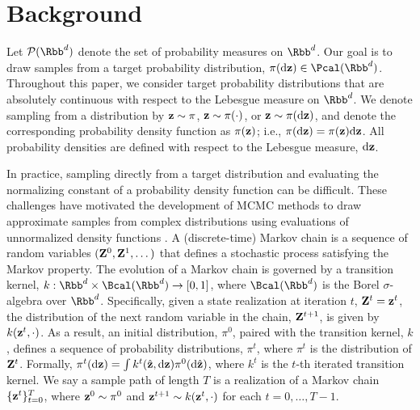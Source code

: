 \documentclass[onefignum,onetabnum]{siamonline250211}
\renewcommand{\d} {{\rm d}}                                %
\newcommand{\bfZ}{{\bf Z}}
\newcommand{\bfz}{{\bf z}}
\begin{document}
%
\section{Background}
\label{sec:background}
Let $\mathcal{P}(\Rbb^d)$ denote the set of probability measures on $\Rbb^d$. 
Our goal is to draw samples from a target probability distribution, $\pi(\d \bfz) \in \Pcal(\Rbb^d)$. Throughout this paper, we consider target probability distributions that are absolutely continuous with respect to the Lebesgue measure on $\Rbb^d$. 
We denote sampling from a distribution by $\bfz \sim \pi$, $\bfz\sim \pi(\cdot)$, or  $\bfz \sim \pi(\d \bfz)$, and denote the corresponding probability density function as $\pi(\bfz)$; i.e., $\pi(\d\bfz)=\pi(\bfz)\d\bfz$. All probability densities are defined with respect to the Lebesgue measure, $\d\bfz$. %

In practice, sampling directly from a target distribution and evaluating the normalizing constant of a probability density function can be difficult. 
%
These challenges have motivated the development of MCMC methods to draw approximate samples from complex distributions using evaluations of unnormalized density functions \cite{meyn_markov_1993, robert_monte_2004, craiu_handbook_2026}.
A (discrete-time) Markov chain is a sequence of random variables $(\bfZ^0, \bfZ^1, \dots)$ that defines a stochastic process satisfying the Markov property. 
The evolution of a Markov chain is governed by a transition kernel, $k: \Rbb^d \times \Bcal(\Rbb^d) \to [0,1]$, where $\Bcal(\Rbb^d)$ is the Borel $\sigma$-algebra over $\Rbb^d$. 
Specifically, given a state realization at iteration $t$, $\bfZ^t = \bfz^t$, the distribution of the next random variable in the chain, $\bfZ^{t+1}$, is given by $k(\bfz^t, \cdot)$. 
As a result, an initial distribution, $\pi^0$, paired with the transition kernel, $k$, defines a sequence of probability distributions, $\pi^t$, where $\pi^t$ is the distribution of $\bfZ^t$. Formally, $\pi^t(\d\bfz)=\int k^{t}(\hat\bfz,\d\bfz)\pi^0(\d\hat\bfz)$, where $k^{t}$ is the $t$-th iterated transition kernel.
We say a sample path of length $T$ is a realization of a Markov chain $\{\bfz^t\}_{t=0}^T$, where $\bfz^0\sim\pi^0$ and $\bfz^{t+1}\sim k(\bfz^t,\cdot)$ for each $t=0,\dots,T-1$.

%
%
%
%
%
%
%
%

%
%

%
 
\end{document}
